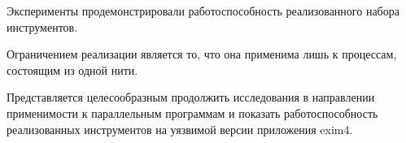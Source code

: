 Эксперименты продемонстрировали работоспособность реализованного
набора инструментов.

Ограничением реализации является то, что она применима лишь
к процессам, состоящим из одной нити.

Представляется целесообразным продолжить исследования в направлении
применимости к параллельным программам и показать работоспособность
реализованных инструментов на уязвимой версии приложения exim4.

\begin{comment}
\section {Особенности реализации} 

\subsection{Описание подсистемы utrace-uprobes}

\bigskip
Как было сказано ранее, система utrace-uprobes используется 
для определения "попадания" на контрольные точки.
При этом utrace предоставляет средства создания 
отладчиков в виде модулей ядра, в то время, как 
uprobes использует utrace для расставления точек 
останова в теле процесса и наблюдения за попаданием 
исполнения на них. 
Рассмотрим особенности использования этой системы 
более подробно.
Как было сказано выше, utrace является подсистемой 
ядра, позволяющей создавать отладчики, работающие в 
пространстве ядра в виде модулей. При этом, модуль 
должен реализовать некоторые функции-обработчики 
событий, происходящих в отлаживаемом приложении. 

Пример:

\bigskip
\begin{lstlisting}
u32 (*report_syscall_entry)(struct utrace_attached_engine *engine,
				struct task_struct *tsk,
				struct pt_regs *regs);

\end{lstlisting}

\bigskip
Как только отлаживаемый процесс совершит системный вызов, будет вызвана 
соответствующая функция отлаживаемого движка - {\texttt report\_sysc
all\_entry()} (разумеется, если она была зарегистрирована). Вызов 
данного обработчика происходит до выполнения системного вызова, 
отладчик может безопасно получать доступ к остановленному отлаживаемому 
процессу. Функция-обработчик возвращает битовую маску, которая определяет, что 
должно произойти далее~--- можно изменять состояние отладки, 
прекращать отладку, скрывать событие от других отладочных 
движков и многое другое. 


\end{comment}
